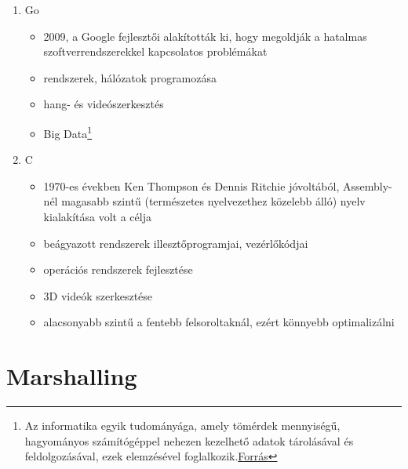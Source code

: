 \documentclass[tocnopagenum]{thesis-ekf}
\theoremstyle{definition}
\theoremstyle{remark}
\begin{document}
\begin{enumerate}
		\begin{itemize}
			\item 1972, Donald D. Chamberlin és Raymond F. Boyce az IBM alkalmazásában, adattáblák egyszerűbb kezelésére
			\item adatbázisok kezelése, karbantartása
			\item Data Science\footnote{Az informatika, a matematikai statisztika és az üzleti elemzés metszetében álló tudományág, amely adatok összegyűjtésével, ezek elemzésével foglalkozik annak érdekében, hogy a vállalatok jobb üzleti döntéseket tudjanak meghozni ezek segítségével. \hyperref{https://qr.ae/pvlYmQ}{}{}{Forrás}}
		\end{itemize}
		\item Go
		\begin{itemize}
			\item 2009, a Google fejlesztői alakították ki, hogy megoldják a hatalmas szoftverrendszerekkel kapcsolatos problémákat
			\item rendszerek, hálózatok programozása
			\item hang- és videószerkesztés
			\item Big Data\footnote{Az informatika egyik tudományága, amely tömérdek mennyiségű, hagyományos számítógéppel nehezen kezelhető adatok tárolásával és feldolgozásával, ezek elemzésével foglalkozik.\hyperref{{https://www.youtube.com/watch?v=bAyrObl7TYE}}{}{}{Forrás}}
		\end{itemize}
		\item C
		\begin{itemize}
			\item 1970-es években Ken Thompson és Dennis Ritchie jóvoltából, Assembly-nél magasabb szintű (természetes nyelvezethez közelebb álló) nyelv kialakítása volt a célja
			\item beágyazott rendszerek illesztőprogramjai, vezérlőkódjai
			\item operációs rendszerek fejlesztése
			\item 3D videók szerkesztése
			\item alacsonyabb szintű a fentebb felsoroltaknál, ezért könnyebb optimalizálni
			\cite{clang1}
		\end{itemize}
	\end{enumerate}\cite{proglanguages1}\cite{proglanguages2}
	
	\chapter{Marshalling}
\end{document}
